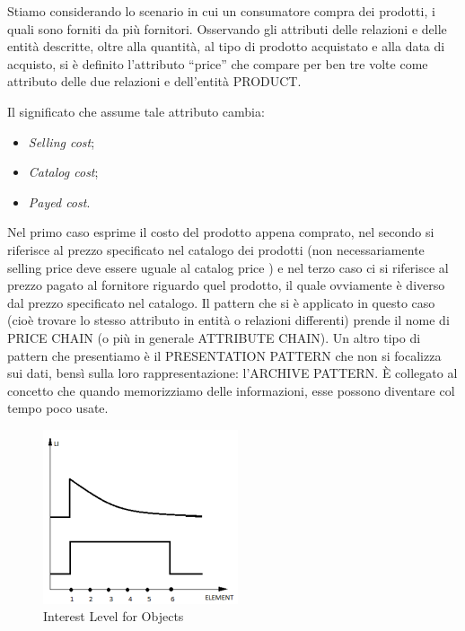 Stiamo considerando lo scenario in cui un consumatore compra dei prodotti, i quali sono forniti da più fornitori. Osservando gli attributi delle relazioni e delle entità descritte, oltre alla quantità, al tipo di prodotto acquistato e alla data di acquisto, si è definito l’attributo “price” che compare per ben tre volte come attributo delle due relazioni e dell’entità PRODUCT. 

Il significato che assume tale attributo cambia: 

\begin{itemize}

\item{\textit{Selling cost}};
\item{\textit{Catalog cost}};
\item{\textit{Payed cost}}.

\end{itemize}

Nel primo caso esprime il costo del prodotto appena comprato, nel secondo si riferisce al prezzo specificato nel catalogo dei prodotti (non necessariamente selling price deve essere uguale al catalog price ) e nel terzo caso ci si riferisce al prezzo pagato al fornitore riguardo quel prodotto, il quale ovviamente è diverso dal prezzo specificato nel catalogo. 
Il pattern che si è applicato in questo caso (cioè trovare lo stesso attributo in entità o relazioni differenti) prende il nome di PRICE CHAIN (o più in generale ATTRIBUTE CHAIN). 
Un altro tipo di pattern che presentiamo è il PRESENTATION PATTERN che non si focalizza sui dati, bensì sulla loro rappresentazione: l’ARCHIVE PATTERN. È collegato al concetto che quando memorizziamo delle informazioni, esse possono diventare col tempo poco usate.

\begin{center}
\begin{figure}[H]
\centering
\includegraphics[scale=1]{figures/interest_lvl.png}
\caption{Interest Level for Objects}
\end{figure}
\end{center}

